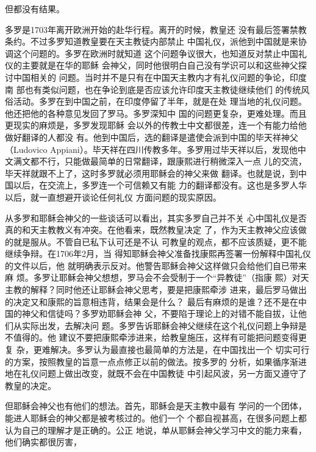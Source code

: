 但都没有结果。%
\par
多罗是1703年离开欧洲开始的赴华行程。离开的时候，教皇还%
没有最后签署禁教条约。不过多罗知道教皇要在天主教徒内部禁止%
中国礼仪，派他到中国就是来协调这个问题的。多罗在欧洲时就知道%
这个问题争议很大，也知道反对禁止中国礼仪的主要就是在华的耶稣%
会神父，同时他很明白自己没有学识可以和这些神父探讨中国相关的%
问题。当时并不是只有在中国天主教内才有礼仪问题的争论，印度南%
部也有类似问题，也在争论到底是否应该允许印度天主教徒继续他们%
的传统风俗活动。多罗在到中国之前，在印度停留了半年，就是在处%
理当地的礼仪问题。他还把他的各种意见发回了罗马。多罗深知中%
国的问题更复杂，更难处理。而且更现实的麻烦是，多罗发现耶稣%
会以外的传教士中文都很差，连一个有能力给他做好翻译的人都没%
有。他到中国后，选的翻译是遣使会派到中国的毕天祥神父（Ludovico%
\space%
Appiani）。毕天祥在四川传教多年。多罗用过毕天祥以后，发现他中%
文满文都不行，只能做最简单的日常翻译，跟康熙进行稍微深入一点%
儿的交流，毕天祥就跟不上了，这时多罗就必须用耶稣会的神父来做%
翻译。也就是说，到中国以后，在交流上，多罗连一个可信赖又有能%
力的翻译都没有。这也是多罗人华以后，就一直想避开谈论任何礼仪%
方面问题的现实原因。%
\par
从多罗和耶稣会神父的一些谈话可以看出，其实多罗自己并不关%
心中国礼仪是否真的和天主教教义有冲突。在他看来，既然教皇决定%
了，作为天主教神父应该做的就是服从。不管自已私下认可还是不认%
可教皇的观点，都不应该质疑，更不能继续争辩。在1706年2月，当%
得知耶稣会神父准备找康熙再签署一份解释中国礼仪的文件以后，他%
就明确表示反对。他警告耶稣会神父这样做只会给他们自已带来麻%
烦。多罗让耶稣会神父想想，罗马会不会受制于一个“异教徒”（指康%
熙）对天主教的解释？同时他还让耶稣会神父思考，要是把康熙牵涉%
进来，最后罗马做出的决定又和康熙的旨意相违背，结果会是什么？%
最后有麻烦的是谁？还不是在中国的神父和信徒吗？多罗劝耶稣会神%
父，不要陷于理论上的对错不能自拔，让他们从实际出发，去解决问%
题。多罗告诉耶稣会神父继续在这个礼仪问题上争辩是不值得的。他%
建议不要把康熙牵涉进来，给教皇施压，这样有可能把问题变得更复%
杂，更难解决。多罗认为最直接也最简单的方法是，在中国找出一个%
切实可行的方案，按照教皇的旨意一点点修正以前的做法。按多罗的%
分析，如果循序渐进地在礼仪问题上做出改变，就既不会在中国教徒%
中引起风波，另一方面又遵守了教皇的决定。%
\par
但耶稣会神父也有他们的想法。首先，耶稣会是天主教中最有%
学问的一个团体，能进人耶稣会的神父都是被考核过的。他们一个%
个都自视甚高，在很多问题上都认为自己的理解才是正确的。公正%
地说，单从耶稣会神父学习中文的能力来看，他们确实都很厉害，%
